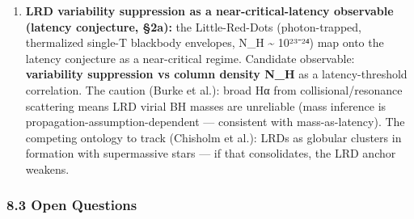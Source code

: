 \documentclass[
]{article}
\begin{document}
\begin{enumerate}
  this is OQ-level conjecture until Q1 moves.
\item
  \textbf{LRD variability suppression as a near-critical-latency
  observable (latency conjecture, §2a):} the Little-Red-Dots
  (photon-trapped, thermalized single-T blackbody envelopes, N\_H
  \textasciitilde{} 10²³⁻²⁴) map onto the latency conjecture as a
  near-critical regime. Candidate observable: \textbf{variability
  suppression vs column density N\_H} as a latency-threshold
  correlation. The caution (Burke et al.): broad Hα from
  collisional/resonance scattering means LRD virial BH masses are
  unreliable (mass inference is propagation-assumption-dependent ---
  consistent with mass-as-latency). The competing ontology to track
  (Chisholm et al.): LRDs as globular clusters in formation with
  supermassive stars --- if that consolidates, the LRD anchor weakens.
\end{enumerate}

\subsubsection{8.3 Open Questions}\label{open-questions}
\end{document}
